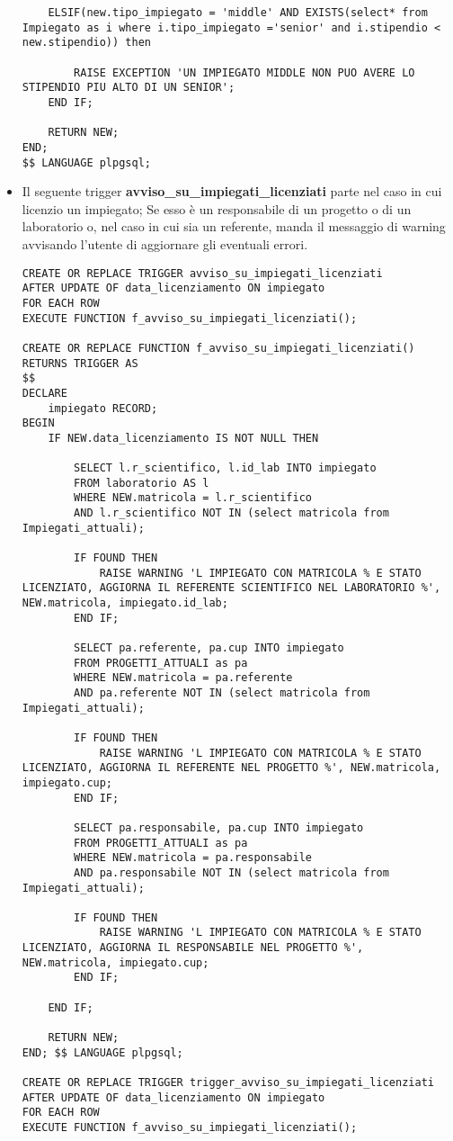 \begin{itemize}
\begin{lstlisting}
	ELSIF(new.tipo_impiegato = 'middle' AND EXISTS(select* from Impiegato as i where i.tipo_impiegato ='senior' and i.stipendio < new.stipendio)) then

		RAISE EXCEPTION 'UN IMPIEGATO MIDDLE NON PUO AVERE LO STIPENDIO PIU ALTO DI UN SENIOR';
	END IF;

	RETURN NEW;
END;
$$ LANGUAGE plpgsql;
\end{lstlisting}

\newpage
\normalsize
\item Il seguente trigger \textbf{avviso\_su\_impiegati\_licenziati} parte nel caso in cui licenzio un impiegato; Se esso è un responsabile di un progetto o di un laboratorio o, nel caso in cui sia un referente, manda il messaggio di warning avvisando l'utente di aggiornare gli eventuali errori.

\scriptsize
\begin{lstlisting}
CREATE OR REPLACE TRIGGER avviso_su_impiegati_licenziati
AFTER UPDATE OF data_licenziamento ON impiegato
FOR EACH ROW
EXECUTE FUNCTION f_avviso_su_impiegati_licenziati();

CREATE OR REPLACE FUNCTION f_avviso_su_impiegati_licenziati() RETURNS TRIGGER AS
$$
DECLARE
	impiegato RECORD;
BEGIN
	IF NEW.data_licenziamento IS NOT NULL THEN

		SELECT l.r_scientifico, l.id_lab INTO impiegato
		FROM laboratorio AS l
		WHERE NEW.matricola = l.r_scientifico
		AND l.r_scientifico NOT IN (select matricola from Impiegati_attuali);

		IF FOUND THEN
			RAISE WARNING 'L IMPIEGATO CON MATRICOLA % E STATO LICENZIATO, AGGIORNA IL REFERENTE SCIENTIFICO NEL LABORATORIO %', NEW.matricola, impiegato.id_lab;
		END IF;

		SELECT pa.referente, pa.cup INTO impiegato
		FROM PROGETTI_ATTUALI as pa
		WHERE NEW.matricola = pa.referente
		AND pa.referente NOT IN (select matricola from Impiegati_attuali);

		IF FOUND THEN
			RAISE WARNING 'L IMPIEGATO CON MATRICOLA % E STATO LICENZIATO, AGGIORNA IL REFERENTE NEL PROGETTO %', NEW.matricola, impiegato.cup;
		END IF;

		SELECT pa.responsabile, pa.cup INTO impiegato
		FROM PROGETTI_ATTUALI as pa
		WHERE NEW.matricola = pa.responsabile
		AND pa.responsabile NOT IN (select matricola from Impiegati_attuali);

		IF FOUND THEN
			RAISE WARNING 'L IMPIEGATO CON MATRICOLA % E STATO LICENZIATO, AGGIORNA IL RESPONSABILE NEL PROGETTO %', NEW.matricola, impiegato.cup;
		END IF;

	END IF;

	RETURN NEW;
END; $$ LANGUAGE plpgsql;

CREATE OR REPLACE TRIGGER trigger_avviso_su_impiegati_licenziati
AFTER UPDATE OF data_licenziamento ON impiegato
FOR EACH ROW
EXECUTE FUNCTION f_avviso_su_impiegati_licenziati();
\end{lstlisting}


\end{itemize}
\newpage

